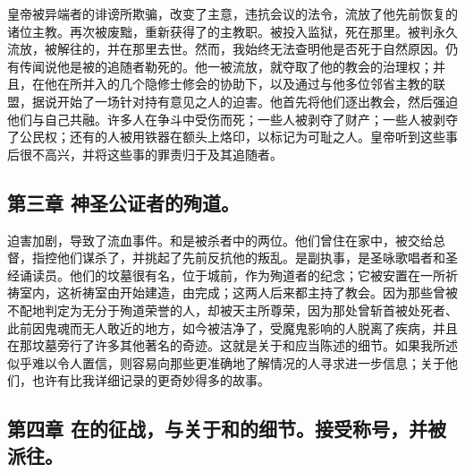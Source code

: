 皇帝被异端者的诽谤所欺骗，改变了主意，违抗会议的法令，流放了他先前恢复的诸位主教。再次被废黜，重新获得了的主教职。被投入监狱，死在那里。被判永久流放，被解往的，并在那里去世。然而，我始终无法查明他是否死于自然原因。仍有传闻说他是被的追随者勒死的。他一被流放，就夺取了他的教会的治理权；并且，在他在所并入的几个隐修士修会的协助下，以及通过与他多位邻省主教的联盟，据说开始了一场针对持有意见之人的迫害。他首先将他们逐出教会，然后强迫他们与自己共融。许多人在争斗中受伤而死；一些人被剥夺了财产；一些人被剥夺了公民权；还有的人被用铁器在额头上烙印，以标记为可耻之人。皇帝听到这些事后很不高兴，并将这些事的罪责归于及其追随者。\par


\subsection{第三章 神圣公证者的殉道。}

迫害加剧，导致了流血事件。和是被杀者中的两位。他们曾住在家中，被交给总督，指控他们谋杀了，并挑起了先前反抗他的叛乱。是副执事，是圣咏歌唱者和圣经诵读员。他们的坟墓很有名，位于城前，作为殉道者的纪念；它被安置在一所祈祷室内，这祈祷室由开始建造，由完成；这两人后来都主持了教会。因为那些曾被不配地判定为无分于殉道荣誉的人，却被天主所尊荣，因为那处曾斩首被处死者、此前因鬼魂而无人敢近的地方，如今被洁净了，受魔鬼影响的人脱离了疾病，并且在那坟墓旁行了许多其他著名的奇迹。这就是关于和应当陈述的细节。如果我所述似乎难以令人置信，则容易向那些更准确地了解情况的人寻求进一步信息；关于他们，也许有比我详细记录的更奇妙得多的故事。\par


\subsection{第四章 在的征战，与关于和的细节。接受称号，并被派往。}

